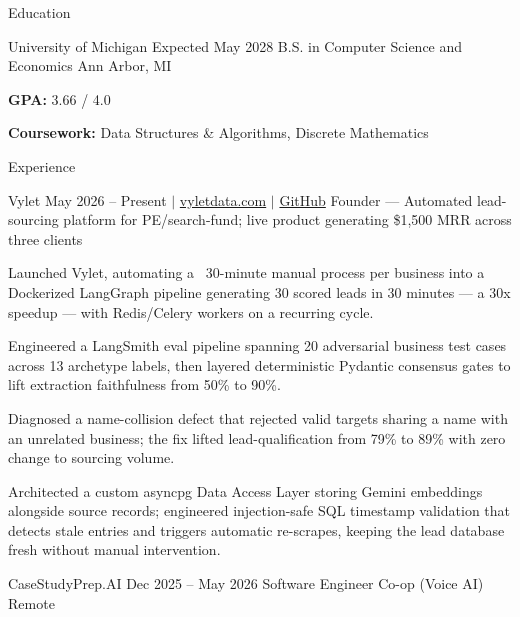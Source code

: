 \documentclass[
	11pt
]{../../../template}
\begin{document}
	\begin{rSection}{E}{ducation}
		\begin{rSectionEntry}
			{University of Michigan}
			{Expected May 2028}
			{B.S. in Computer Science and Economics}
			{}
			{Ann Arbor, MI}

			\item \textbf{GPA:} 3.66 / 4.0
			\item \textbf{Coursework:} Data Structures \& Algorithms, Discrete Mathematics
		\end{rSectionEntry}
	\end{rSection}

	\begin{rSection}{E}{xperience}
		\begin{rSectionEntry}
			{Vylet}
			{May 2026 -- Present $\vert$ \href{https://vyletdata.com}{vyletdata.com} $\vert$ \href{https://github.com/Verdent06/Lead-Gen-Agentic-Pipeline}{GitHub}}
			{Founder --- Automated lead-sourcing platform for PE/search-fund; live product generating \$1,500 MRR across three clients}
			{}
			{}

			\item Launched Vylet, automating a ~30-minute manual process per business into a Dockerized LangGraph pipeline generating 30 scored leads in 30 minutes --- a 30x speedup --- with Redis/Celery workers on a recurring cycle.
			\item Engineered a LangSmith eval pipeline spanning 20 adversarial business test cases across 13 archetype labels, then layered deterministic Pydantic consensus gates to lift extraction faithfulness from 50\% to 90\%.
			\item Diagnosed a name-collision defect that rejected valid targets sharing a name with an unrelated business; the fix lifted lead-qualification from 79\% to 89\% with zero change to sourcing volume.
			\item Architected a custom asyncpg Data Access Layer storing Gemini embeddings alongside source records; engineered injection-safe SQL timestamp validation that detects stale entries and triggers automatic re-scrapes, keeping the lead database fresh without manual intervention.
		\end{rSectionEntry}

		\begin{rSectionEntry}
			{CaseStudyPrep.AI}
			{Dec 2025 -- May 2026}
			{Software Engineer Co-op (Voice AI)}
			{}
			{Remote}


\end{rSectionEntry}
\end{rSection}
\end{document}
